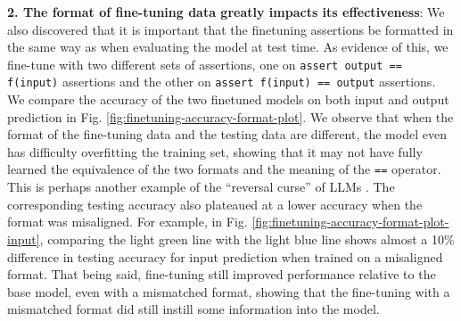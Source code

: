 \textbf{2. The format of fine-tuning data greatly impacts its effectiveness}: We also discovered that it is important that the finetuning assertions be formatted in the same way as when evaluating the model at test time. As evidence of this, we fine-tune \codellamalarge with two different sets of assertions, one on \texttt{assert output == f(input)} assertions and the other on \texttt{assert f(input) == output} assertions. We compare the accuracy of the two finetuned models on both input and output prediction in Fig. \ref{fig:finetuning-accuracy-format-plot}. We observe that when the format of the fine-tuning data and the testing data are different, the model even has difficulty overfitting the training set, showing that it may not have fully learned the equivalence of the two formats and the meaning of the \texttt{==} operator. This is perhaps another example of the ``reversal curse'' of LLMs \citep{berglund2023reversal}. The corresponding testing accuracy also plateaued at a lower accuracy when the format was misaligned. For example, in Fig. \ref{fig:finetuning-accuracy-format-plot-input}, comparing the light green line with the light blue line shows almost a 10\% difference in testing accuracy for input prediction when trained on a misaligned format. That being said, fine-tuning still improved performance relative to the base model, even with a mismatched format, showing that the fine-tuning with a mismatched format did still instill some information into the model.

